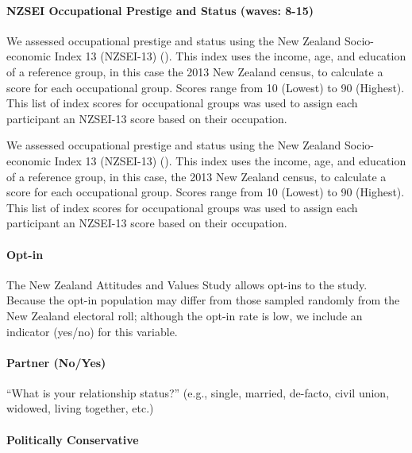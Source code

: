 \documentclass[
  single column]{article}
\let\oldparagraph\paragraph
\renewcommand{\paragraph}[1]{\oldparagraph{#1}\mbox{}}
\begin{document}
\paragraph{NZSEI Occupational Prestige and Status (waves:
8-15)}\label{nzsei-occupational-prestige-and-status-waves-8-15}

We assessed occupational prestige and status using the New Zealand
Socio-economic Index 13 (NZSEI-13) (). This index uses the income, age, and education of
a reference group, in this case the 2013 New Zealand census, to
calculate a score for each occupational group. Scores range from 10
(Lowest) to 90 (Highest). This list of index scores for occupational
groups was used to assign each participant an NZSEI-13 score based on
their occupation.

We assessed occupational prestige and status using the New Zealand
Socio-economic Index 13 (NZSEI-13) (). This index uses the income, age, and education of
a reference group, in this case, the 2013 New Zealand census, to
calculate a score for each occupational group. Scores range from 10
(Lowest) to 90 (Highest). This list of index scores for occupational
groups was used to assign each participant an NZSEI-13 score based on
their occupation.

\paragraph{Opt-in}\label{opt-in}

The New Zealand Attitudes and Values Study allows opt-ins to the study.
Because the opt-in population may differ from those sampled randomly
from the New Zealand electoral roll; although the opt-in rate is low, we
include an indicator (yes/no) for this variable.

\paragraph{Partner (No/Yes)}\label{partner-noyes}

``What is your relationship status?'' (e.g., single, married, de-facto,
civil union, widowed, living together, etc.)

\paragraph{Politically Conservative}\label{politically-conservative}
\end{document}
